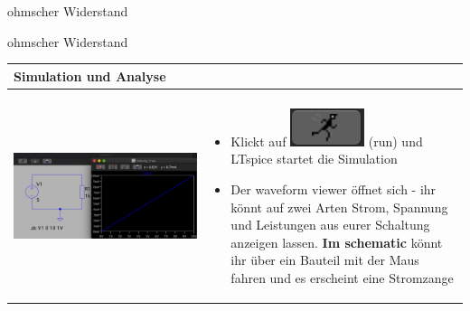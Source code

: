\begin{frame}[t]{ohmscher Widerstand}
\begin{spacing}{0.9}
\begin{tiny}
\begin{table}[h!]
    \end{table}
    
    \end{tiny} \end{spacing}
    
     \end{frame}
    
     \begin{frame}[t]{ohmscher Widerstand}
    
      \begin{spacing}{0.9} \begin{tiny}
      \begin{table}[h!]
        \begin{tabular}{p{5cm} p{5cm}}
          \hline
          \textbf{Simulation und Analyse} & \\
          \hline \\
          \begin{minipage}{.5\textwidth}
            \includegraphics[width=\linewidth]{pictures/analysis.png}
          \end{minipage} 
          & 
          \begin{minipage}{.5\textwidth}
          \begin{itemize}
            \item Klickt auf \includegraphics[scale=0.3]{pictures/run.png} (run) und LTspice startet die Simulation
            \item Der waveform viewer öffnet sich - ihr könnt auf zwei Arten Strom, Spannung und Leistungen aus eurer Schaltung anzeigen lassen. \newline\newline
            \textbf{Im schematic} könnt ihr über ein Bauteil mit der Maus fahren und es erscheint eine Stromzange\newline\newline

\end{itemize}
\end{minipage}
\end{tabular}
\end{table}
\end{tiny}
\end{spacing}
\end{frame}
